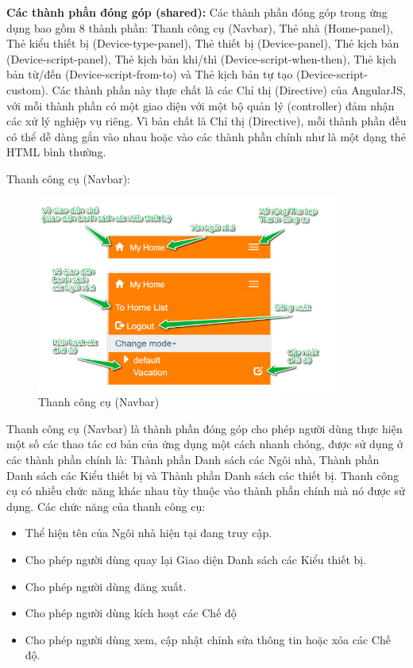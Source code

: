 \documentclass[11pt,a4paper,oneside]{book}
\begin{document}
\textbf{Các thành phần đóng góp (shared):} Các thành phần đóng góp trong ứng dụng bao gồm 8 thành phần: Thanh công cụ (Navbar), Thẻ nhà (Home-panel), Thẻ kiểu thiết bị (Device-type-panel), Thẻ thiết bị (Device-panel), Thẻ kịch bản (Device-script-panel), Thẻ kịch bản khi/thì (Device-script-when-then), Thẻ kịch bản từ/đến (Device-script-from-to) và Thẻ kịch bản tự tạo (Device-script-custom). Các thành phần này thực chất là các Chỉ thị (Directive) của AngularJS, với mỗi thành phần có một giao diện với một bộ quản lý (controller) đảm nhận các xử lý nghiệp vụ riêng. Vì bản chất là Chỉ thị (Directive), mỗi thành phần đều có thể dễ dàng gắn vào nhau hoặc vào các thành phần chính như là một dạng thẻ HTML bình thường.

Thanh công cụ (Navbar):

\begin{figure}[h]
  \centering
     \includegraphics[width=10cm]{6-navbar}
  \caption{Thanh công cụ (Navbar)}\label{fig:6-navbar}
\end{figure}

Thanh công cụ (Navbar) là thành phần đóng góp cho phép người dùng thực hiện một số các thao tác cơ bản của ứng dụng một cách nhanh chóng, được sử dụng ở các thành phần chính là: Thành phần Danh sách các Ngôi nhà, Thành phần Danh sách các Kiểu thiết bị và Thành phần Danh sách các thiết bị. Thanh công cụ có nhiều chức năng khác nhau tùy thuộc vào thành phần chính mà nó được sử dụng. Các chức năng của thanh công cụ:

\begin{itemize}[topsep=1mm,itemsep=-0.5mm]
\item Thể hiện tên của Ngôi nhà hiện tại đang truy cập.
\item Cho phép người dùng quay lại Giao diện Danh sách các Kiểu thiết bị.
\item Cho phép người dùng đăng xuất.
\item Cho phép người dùng kích hoạt các Chế độ
\item Cho phép người dùng xem, cập nhật chỉnh sửa thông tin hoặc xóa các Chế độ.
\vspace{1mm}
\end{itemize}
\end{document}
